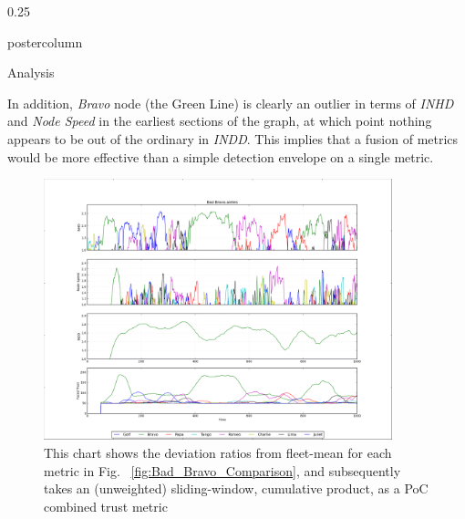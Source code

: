 \documentclass[final,hyperref={pdfpagelabels=false}]{beamer}
\def\colwidth{0.25\linewidth}
\begin{document}
\begin{frame}[fragile]
\begin{columns}[t]
\begin{column}{\colwidth}
\begin{beamercolorbox}[center,wd=\textwidth]{postercolumn}
\begin{minipage}[T]{.98\textwidth}
{\begin{block}{Analysis}
              \vspace{\baselineskip}

              In addition, \emph{Bravo} node (the Green Line) is clearly an outlier in terms of \emph{INHD} and \emph{Node Speed} in the earliest sections of the graph, at which point nothing appears to be out of the ordinary in \emph{INDD}. This implies that a fusion of metrics would be more effective than a simple detection envelope on a single metric.

              \begin{figure}
                \includegraphics[width=0.9\textwidth]{figures/Bad_Bravo_Fusion}
                \caption{This chart shows the deviation ratios from fleet-mean for each metric in Fig. ~\ref{fig:Bad_Bravo_Comparison}, and subsequently takes an (unweighted) sliding-window, cumulative product, as a PoC combined trust metric}
                \label{fig:Bad_Bravo_Fusion}
              \end{figure}


            \end{block}
        
          }
        \end{minipage}
      \end{beamercolorbox}
    \end{column}


\end{columns}
\end{frame}
\end{document}

